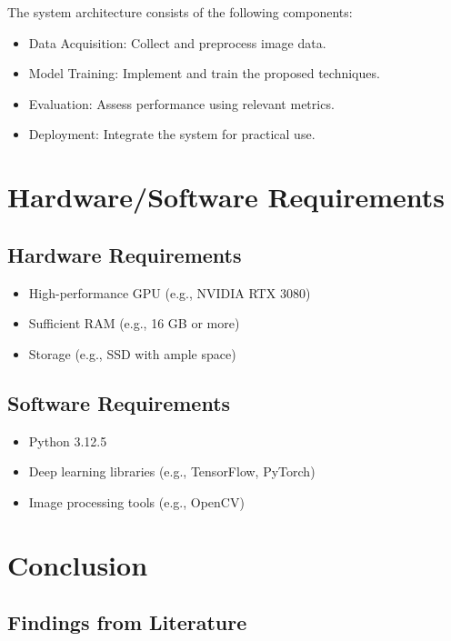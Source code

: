 \documentclass{article}
\begin{document}
The system architecture consists of the following components:
\begin{itemize}
    \item Data Acquisition: Collect and preprocess image data.
    \item Model Training: Implement and train the proposed techniques.
    \item Evaluation: Assess performance using relevant metrics.
    \item Deployment: Integrate the system for practical use.
\end{itemize}

\section{Hardware/Software Requirements}

\subsection{Hardware Requirements}

\begin{itemize}
    \item High-performance GPU (e.g., NVIDIA RTX 3080)
    \item Sufficient RAM (e.g., 16 GB or more)
    \item Storage (e.g., SSD with ample space)
\end{itemize}

\subsection{Software Requirements}

\begin{itemize}
    \item Python 3.12.5
    \item Deep learning libraries (e.g., TensorFlow, PyTorch)
    \item Image processing tools (e.g., OpenCV)
\end{itemize}

\section{Conclusion}

\subsection{Findings from Literature}
\end{document}
